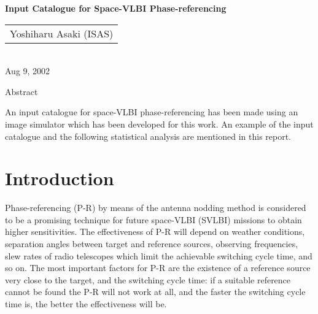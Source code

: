 %
%
%
%
%

\pagestyle{empty}
\setlength{\textheight}{245mm}


%
%
\begin{center}
{\Large \bf
        Input Catalogue for Space-VLBI Phase-referencing
} \vspace{5mm} \\
\end{center}
%
%
\begin{center}
\begin{tabular}{l}
Yoshiharu Asaki (ISAS) \\
\end{tabular}
\\
Aug 9, 2002 \\
\end{center}
%
\setlength{\parindent}{5mm}
%
\begin{center}
{\Large Abstract}
\end{center}
%
An input catalogue for space-VLBI phase-referencing 
has been made using an image simulator which has been 
developed for this work. An example of the input catalogue 
and the following statistical analysis are mentioned in this 
report. 

\section{
    Introduction
}
Phase-referencing (P-R) by means of the antenna nodding method 
is considered to be a promising technique for future space-VLBI 
(SVLBI) missions to obtain higher sensitivities. The effectiveness 
of P-R will depend on weather conditions, separation 
angles between target and reference sources, observing 
frequencies, slew rates of radio telescopes which limit the 
achievable switching cycle time, and so on. The most important 
factors for P-R are the existence of a reference source very 
close to the target, and the switching cycle time: if a suitable 
reference cannot be found the P-R will not work at all, and the 
faster the switching cycle time is, the better the effectiveness 
will be. 

